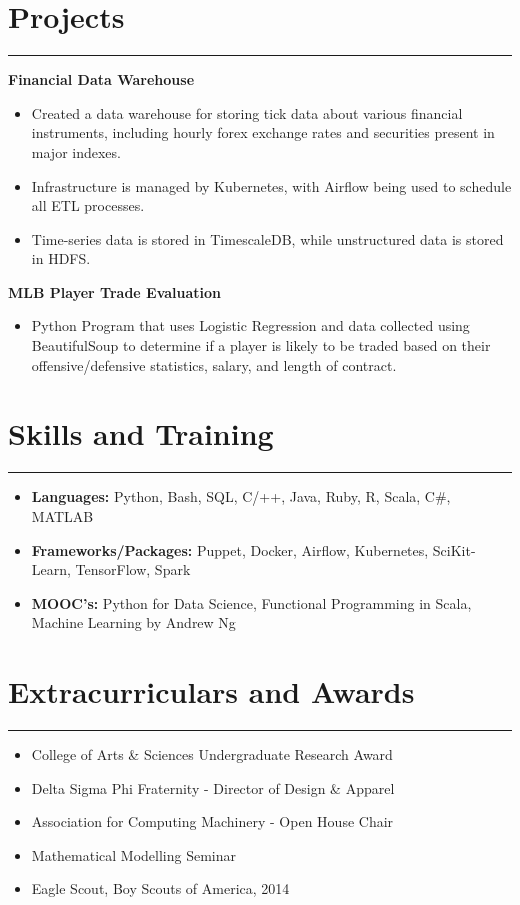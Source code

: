 \documentclass[11pt]{article}
\newcommand{\resumesection}[1]{\vspace{-0.2cm}\section*{#1}\vspace{-0.2cm}\hrule\vspace{0.2cm}}
\begin{document}
\resumesection{Projects}
\textbf{Financial Data Warehouse}
\begin{itemize}
	\item Created a data warehouse for storing tick data about various financial instruments, including hourly forex exchange rates and securities present in major indexes.
	\item Infrastructure is managed by Kubernetes, with Airflow being used to schedule all ETL processes.
	\item Time-series data is stored in TimescaleDB, while unstructured data is stored in HDFS.
\end{itemize}

\textbf{MLB Player Trade Evaluation}
\begin{itemize}
	\item Python Program that uses Logistic Regression and data collected using BeautifulSoup to determine if a player is likely to be traded based on their offensive/defensive statistics, salary, and length of contract.
\end{itemize}




\resumesection{Skills and Training}
\begin{itemize}
	\item \textbf{Languages:} Python, Bash, SQL, C/++, Java, Ruby, R, Scala, C\#, MATLAB
	\item \textbf{Frameworks/Packages:} Puppet, Docker, Airflow, Kubernetes, SciKit-Learn, TensorFlow, Spark
	\item \textbf{MOOC's:} Python for Data Science, Functional Programming in Scala, Machine Learning by Andrew Ng
\end{itemize}

\resumesection{Extracurriculars and Awards}
\begin{itemize}
	\item College of Arts \& Sciences Undergraduate Research Award
	\item Delta Sigma Phi Fraternity - Director of Design \& Apparel 
	\item Association for Computing Machinery - Open House Chair 
	\item Mathematical Modelling Seminar
	\item Eagle Scout, Boy Scouts of America, 2014
\end{itemize}


\end{document}
